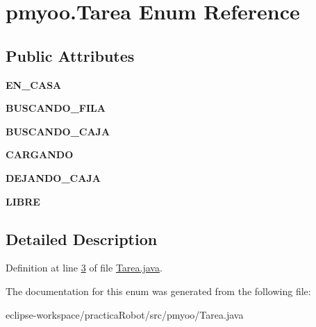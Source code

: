 \hypertarget{enumpmyoo_1_1_tarea}{}\section{pmyoo.\+Tarea Enum Reference}
\label{enumpmyoo_1_1_tarea}
\subsection*{Public Attributes}
\begin{DoxyCompactItemize}
\item 
\mbox{\label{enumpmyoo_1_1_tarea_a7f56ffe506b453b5ef9b7b1881478ee8}} 
{\bfseries E\+N\+\_\+\+C\+A\+SA}
\item 
\mbox{\label{enumpmyoo_1_1_tarea_a3906a58969e98a1ae766e088685a6876}} 
{\bfseries B\+U\+S\+C\+A\+N\+D\+O\+\_\+\+F\+I\+LA}
\item 
\mbox{\label{enumpmyoo_1_1_tarea_a43e19ddc64f0744cdbb06bb5dbee1524}} 
{\bfseries B\+U\+S\+C\+A\+N\+D\+O\+\_\+\+C\+A\+JA}
\item 
\mbox{\label{enumpmyoo_1_1_tarea_a86fa0c0afd0dc27778dfdae62b31d772}} 
{\bfseries C\+A\+R\+G\+A\+N\+DO}
\item 
\mbox{\label{enumpmyoo_1_1_tarea_a76e08179bed691ab3015d43e2521dd13}} 
{\bfseries D\+E\+J\+A\+N\+D\+O\+\_\+\+C\+A\+JA}
\item 
\mbox{\label{enumpmyoo_1_1_tarea_a583f8c5567bf1e805a60562d3b186a82}} 
{\bfseries L\+I\+B\+RE}
\end{DoxyCompactItemize}


\subsection{Detailed Description}


Definition at line \mbox{\hyperlink{_tarea_8java_source_l00003}{3}} of file \mbox{\hyperlink{_tarea_8java_source}{Tarea.\+java}}.



The documentation for this enum was generated from the following file\+:\begin{DoxyCompactItemize}
\item 
eclipse-\/workspace/practica\+Robot/src/pmyoo/Tarea.\+java\end{DoxyCompactItemize}
